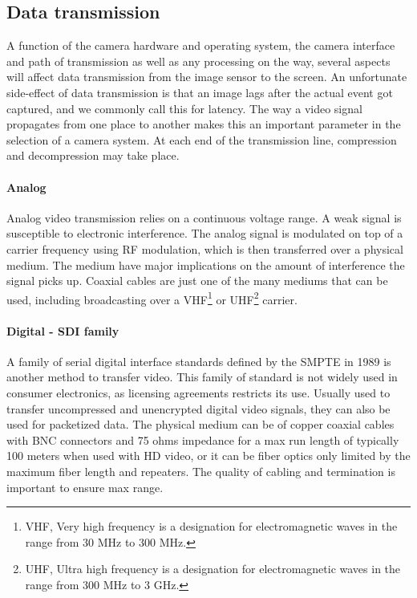 \subsection{Data transmission}
A function of the camera hardware and operating system, the camera interface and path of transmission as well as any processing on the way, several aspects will affect data transmission from the image sensor to the screen. An unfortunate side-effect of data transmission is that an image lags after the actual event got captured, and we commonly call this for latency. The way a video signal propagates from one place to another makes this an important parameter in the selection of a camera system. At each end of the transmission line, compression and decompression may take place.

\paragraph{Analog}
Analog video transmission relies on a continuous voltage range. A weak signal is susceptible to electronic interference. The analog signal is modulated on top of a carrier frequency using RF modulation, which is then transferred over a physical medium. The medium have major implications on the amount of interference the signal picks up. Coaxial cables are just one of the many mediums that can be used, including broadcasting over a VHF\footnote{VHF, Very high frequency is a designation for electromagnetic waves in the range from 30 MHz to 300 MHz.} or UHF\footnote{UHF, Ultra high frequency is a designation for electromagnetic waves in the range from 300 MHz to 3 GHz.} carrier.
\paragraph{Digital - SDI family}
A family of serial digital interface standards defined by the SMPTE in 1989 \citep{poynton03} is another method to transfer video. This family of standard is not widely used in consumer electronics, as licensing agreements restricts its use. Usually used to transfer uncompressed and unencrypted digital video signals, they can also be used for packetized data. The physical medium can be of copper coaxial cables with BNC connectors and 75 ohms impedance for a max run length of typically 100 meters when used with HD video, or it can be fiber optics only limited by the maximum fiber length and repeaters. The quality of cabling and termination is important to ensure max range. \citet{wikisdi15}

